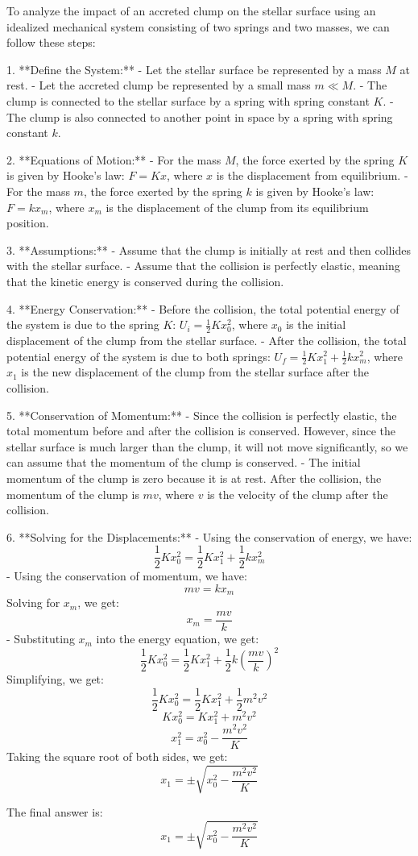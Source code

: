 To analyze the impact of an accreted clump on the stellar surface using an idealized mechanical system consisting of two springs and two masses, we can follow these steps:

1. **Define the System:**
   - Let the stellar surface be represented by a mass \(M\) at rest.
   - Let the accreted clump be represented by a small mass \(m \ll M\).
   - The clump is connected to the stellar surface by a spring with spring constant \(K\).
   - The clump is also connected to another point in space by a spring with spring constant \(k\).

2. **Equations of Motion:**
   - For the mass \(M\), the force exerted by the spring \(K\) is given by Hooke's law: \(F = Kx\), where \(x\) is the displacement from equilibrium.
   - For the mass \(m\), the force exerted by the spring \(k\) is given by Hooke's law: \(F = kx_m\), where \(x_m\) is the displacement of the clump from its equilibrium position.

3. **Assumptions:**
   - Assume that the clump is initially at rest and then collides with the stellar surface.
   - Assume that the collision is perfectly elastic, meaning that the kinetic energy is conserved during the collision.

4. **Energy Conservation:**
   - Before the collision, the total potential energy of the system is due to the spring \(K\): \(U_i = \frac{1}{2}Kx_0^2\), where \(x_0\) is the initial displacement of the clump from the stellar surface.
   - After the collision, the total potential energy of the system is due to both springs: \(U_f = \frac{1}{2}Kx_1^2 + \frac{1}{2}kx_m^2\), where \(x_1\) is the new displacement of the clump from the stellar surface after the collision.

5. **Conservation of Momentum:**
   - Since the collision is perfectly elastic, the total momentum before and after the collision is conserved. However, since the stellar surface is much larger than the clump, it will not move significantly, so we can assume that the momentum of the clump is conserved.
   - The initial momentum of the clump is zero because it is at rest. After the collision, the momentum of the clump is \(mv\), where \(v\) is the velocity of the clump after the collision.

6. **Solving for the Displacements:**
   - Using the conservation of energy, we have:
     \[
     \frac{1}{2}Kx_0^2 = \frac{1}{2}Kx_1^2 + \frac{1}{2}kx_m^2
     \]
   - Using the conservation of momentum, we have:
     \[
     mv = kx_m
     \]
     Solving for \(x_m\), we get:
     \[
     x_m = \frac{mv}{k}
     \]
   - Substituting \(x_m\) into the energy equation, we get:
     \[
     \frac{1}{2}Kx_0^2 = \frac{1}{2}Kx_1^2 + \frac{1}{2}k\left(\frac{mv}{k}\right)^2
     \]
     Simplifying, we get:
     \[
     \frac{1}{2}Kx_0^2 = \frac{1}{2}Kx_1^2 + \frac{1}{2}m^2v^2
     \]
     \[
     Kx_0^2 = Kx_1^2 + m^2v^2
     \]
     \[
     x_1^2 = x_0^2 - \frac{m^2v^2}{K}
     \]
     Taking the square root of both sides, we get:
     \[
     x_1 = \pm \sqrt{x_0^2 - \frac{m^2v^2}{K}}
     \]

The final answer is:
\[
\boxed{x_1 = \pm \sqrt{x_0^2 - \frac{m^2v^2}{K}}}
\]